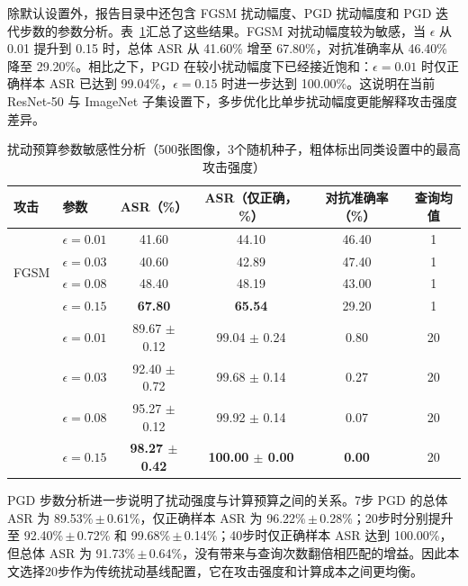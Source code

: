 \documentclass[type=bachelor,oneside]{fduthesis}
\newcommand{\best}[1]{\textbf{#1}}
\newcommand{\tablefont}{\small}
\begin{document}
除默认设置外，报告目录中还包含 FGSM 扰动幅度、PGD 扰动幅度和 PGD 迭代步数的参数分析。表~\ref{tab:traditional_param_ablation}汇总了这些结果。FGSM 对扰动幅度较为敏感，当 $\epsilon$ 从 0.01 提升到 0.15 时，总体 ASR 从 41.60\% 增至 67.80\%，对抗准确率从 46.40\% 降至 29.20\%。相比之下，PGD 在较小扰动幅度下已经接近饱和：$\epsilon=0.01$ 时仅正确样本 ASR 已达到 99.04\%，$\epsilon=0.15$ 时进一步达到 100.00\%。这说明在当前 ResNet-50 与 ImageNet 子集设置下，多步优化比单步扰动幅度更能解释攻击强度差异。

\begin{table}[htbp]
  \centering
  \caption{扰动预算参数敏感性分析（500张图像，3个随机种子，粗体标出同类设置中的最高攻击强度）}
  \label{tab:traditional_param_ablation}
  \tablefont
  \setlength{\tabcolsep}{4pt}
  \renewcommand{\arraystretch}{1.12}
  \begin{tabular}{@{}llcccc@{}}
    \toprule
    攻击 & 参数 & ASR（\%） & ASR（仅正确，\%） & 对抗准确率（\%） & 查询均值 \\
    \midrule
    \multirow{4}{*}{FGSM}
      & $\epsilon=0.01$ & 41.60 & 44.10 & 46.40 & 1 \\
      & $\epsilon=0.03$ & 40.60 & 42.89 & 47.40 & 1 \\
      & $\epsilon=0.08$ & 48.40 & 48.19 & 43.00 & 1 \\
      & $\epsilon=0.15$ & \best{67.80} & \best{65.54} & 29.20 & 1 \\
    \addlinespace[2pt]
    \multirow{4}{*}{PGD}
      & $\epsilon=0.01$ & 89.67 $\pm$ 0.12 & 99.04 $\pm$ 0.24 & 0.80 & 20 \\
      & $\epsilon=0.03$ & 92.40 $\pm$ 0.72 & 99.68 $\pm$ 0.14 & 0.27 & 20 \\
      & $\epsilon=0.08$ & 95.27 $\pm$ 0.12 & 99.92 $\pm$ 0.14 & 0.07 & 20 \\
      & $\epsilon=0.15$ & \best{98.27 $\pm$ 0.42} & \best{100.00 $\pm$ 0.00} & \best{0.00} & 20 \\
    \bottomrule
  \end{tabular}
\end{table}

PGD 步数分析进一步说明了扰动强度与计算预算之间的关系。7步 PGD 的总体 ASR 为 89.53\%\,$\pm$\,0.61\%，仅正确样本 ASR 为 96.22\%\,$\pm$\,0.28\%；20步时分别提升至 92.40\%\,$\pm$\,0.72\% 和 99.68\%\,$\pm$\,0.14\%；40步时仅正确样本 ASR 达到 100.00\%，但总体 ASR 为 91.73\%\,$\pm$\,0.64\%，没有带来与查询次数翻倍相匹配的增益。因此本文选择20步作为传统扰动基线配置，它在攻击强度和计算成本之间更均衡。
\end{document}
